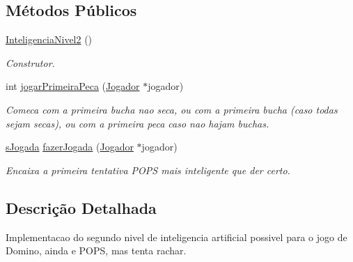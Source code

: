 \subsection*{Métodos Públicos}
\begin{DoxyCompactItemize}
\item 
\hypertarget{classInteligenciaNivel2_a5f5acc27c7d4e1238f08ee9aa66a281c}{
\hyperlink{classInteligenciaNivel2_a5f5acc27c7d4e1238f08ee9aa66a281c}{InteligenciaNivel2} ()}
\label{classInteligenciaNivel2_a5f5acc27c7d4e1238f08ee9aa66a281c}

\begin{DoxyCompactList}\small\item\em Construtor. \item\end{DoxyCompactList}\item 
int \hyperlink{classInteligenciaNivel2_a2e30feca2d1071705638d33f825ef207}{jogarPrimeiraPeca} (\hyperlink{classJogador}{Jogador} $\ast$jogador)
\begin{DoxyCompactList}\small\item\em Comeca com a primeira bucha nao seca, ou com a primeira bucha (caso todas sejam secas), ou com a primeira peca caso nao hajam buchas. \item\end{DoxyCompactList}\item 
\hyperlink{structsJogada}{sJogada} \hyperlink{classInteligenciaNivel2_afff2fde3479f75e8282b330282c68c0e}{fazerJogada} (\hyperlink{classJogador}{Jogador} $\ast$jogador)
\begin{DoxyCompactList}\small\item\em Encaixa a primeira tentativa POPS mais inteligente que der certo. \item\end{DoxyCompactList}\end{DoxyCompactItemize}


\subsection{Descrição Detalhada}
Implementacao do segundo nivel de inteligencia artificial possivel para o jogo de Domino, ainda e POPS, mas tenta rachar. 

